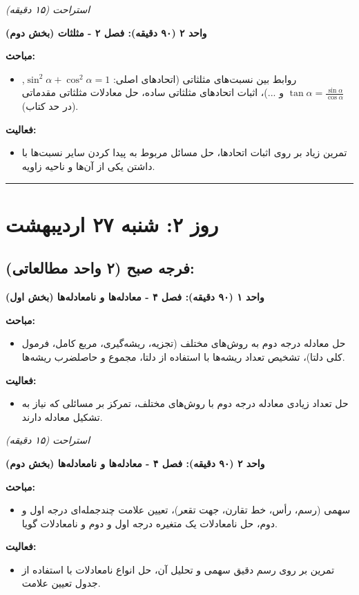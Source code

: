 \documentclass[12pt,a4paper]{article}
\newcommand{\studyunit}[1]{\par\medskip\noindent\textbf{#1}\par\nopagebreak}
\newcommand{\topics}{\par\medskip\noindent\textbf{مباحث:}\begin{itemize}[nosep,after=\vspace{-0.5\baselineskip}]}
\newcommand{\activities}{\par\medskip\noindent\textbf{فعالیت:}\begin{itemize}[nosep,after=\vspace{-0.5\baselineskip}]}
\newcommand{\breaktime}[1]{\par\smallskip\centerline{\textit{#1}}\smallskip}
\begin{document}
    \breaktime{استراحت (۱۵ دقیقه)}

    \studyunit{واحد ۲ (۹۰ دقیقه): فصل ۲ - مثلثات (بخش دوم)}
        \topics
            \item روابط بین نسبت‌های مثلثاتی (اتحادهای اصلی: $\sin^2\alpha + \cos^2\alpha = 1$, $\tan\alpha = \frac{\sin\alpha}{\cos\alpha}$ و ...)، اثبات اتحادهای مثلثاتی ساده، حل معادلات مثلثاتی مقدماتی (در حد کتاب).
        \end{itemize}
        \activities
            \item تمرین زیاد بر روی اثبات اتحادها، حل مسائل مربوط به پیدا کردن سایر نسبت‌ها با داشتن یکی از آن‌ها و ناحیه زاویه.
        \end{itemize}

\rule{\linewidth}{0.4pt}\vspace{1em} %

\section*{روز ۲: شنبه ۲۷ اردیبهشت}

\subsection*{فرجه صبح (۲ واحد مطالعاتی):}
    \studyunit{واحد ۱ (۹۰ دقیقه): فصل ۴ - معادله‌ها و نامعادله‌ها (بخش اول)}
        \topics
            \item حل معادله درجه دوم به روش‌های مختلف (تجزیه، ریشه‌گیری، مربع کامل، فرمول کلی دلتا)، تشخیص تعداد ریشه‌ها با استفاده از دلتا، مجموع و حاصلضرب ریشه‌ها.
        \end{itemize}
        \activities
            \item حل تعداد زیادی معادله درجه دوم با روش‌های مختلف، تمرکز بر مسائلی که نیاز به تشکیل معادله دارند.
        \end{itemize}

    \breaktime{استراحت (۱۵ دقیقه)}

    \studyunit{واحد ۲ (۹۰ دقیقه): فصل ۴ - معادله‌ها و نامعادله‌ها (بخش دوم)}
        \topics
            \item سهمی (رسم، رأس، خط تقارن، جهت تقعر)، تعیین علامت چندجمله‌ای درجه اول و دوم، حل نامعادلات یک متغیره درجه اول و دوم و نامعادلات گویا.
        \end{itemize}
        \activities
            \item تمرین بر روی رسم دقیق سهمی و تحلیل آن، حل انواع نامعادلات با استفاده از جدول تعیین علامت.
        \end{itemize}
\end{document}
